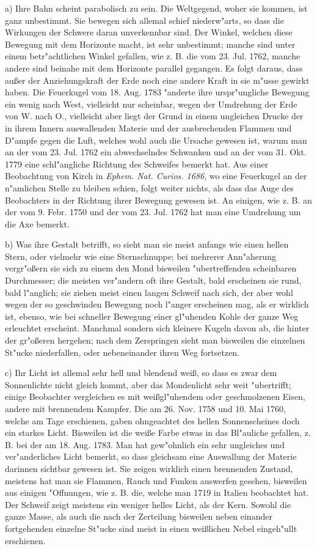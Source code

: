 \documentclass[a4paper, 11pt, oneside, polutonikogreek, german]{article}
\begin{document}
a) Ihre Bahn scheint parabolisch zu sein. Die Weltgegend, woher sie kommen, ist ganz unbestimmt. Sie bewegen sich allemal schief niederw"arts, so dass die Wirkungen der Schwere daran unverkennbar sind. Der Winkel, welchen diese Bewegung mit dem Horizonte macht, ist sehr unbestimmt; manche sind unter einem betr"achtlichen Winkel gefallen, wie z. B. die vom 23. Jul. 1762, manche andere sind beinahe mit dem Horizonte parallel gegangen. Es folgt daraus, dass außer der Anziehungskraft der Erde noch eine andere Kraft in sie m"usse gewirkt haben. Die Feuerkugel vom 18. Aug. 1783 "anderte ihre urspr"ungliche Bewegung ein wenig nach West, vielleicht nur scheinbar, wegen der Umdrehung der Erde von W. nach O., vielleicht aber liegt der Grund in einem ungleichen Drucke der in ihrem Innern auswallenden Materie und der ausbrechenden Flammen und D"ampfe gegen die Luft, welches wohl auch die Ursache gewesen ist, warum man an der vom 23. Jul. 1762 ein abwechselndes Schwanken und an der vom 31. Okt. 1779 eine schl"angliche Richtung des Schweifes bemerkt hat. Aus einer Beobachtung von Kirch in \emph{Ephem. Nat. Curios. 1686}, wo eine Feuerkugel an der n"amlichen Stelle zu bleiben schien, folgt weiter nichts, als dass das Auge des Beobachters in der Richtung ihrer Bewegung gewesen ist. An einigen, wie z. B. an der vom 9. Febr. 1750 und der vom 23. Jul. 1762 hat man eine Umdrehung um die Axe bemerkt.

b) Was ihre Gestalt betrifft, so sieht man sie meist anfangs wie einen hellen Stern, oder vielmehr wie eine Sternschnuppe; bei mehrerer Ann"aherung vergr"oßern sie sich zu einem den Mond bisweilen "ubertreffenden scheinbaren Durchmesser; die meisten ver"andern oft ihre Gestalt, bald erscheinen sie rund, bald l"anglich; sie ziehen meist einen langen Schweif nach sich, der aber wohl wegen der so geschwinden Bewegung noch l"anger erscheinen mag, als er wirklich ist, ebenso, wie bei schneller Bewegung einer gl"uhenden Kohle der ganze Weg erleuchtet erscheint. Manchmal sondern sich kleinere Kugeln davon ab, die hinter der gr"oßeren hergehen; nach dem Zerspringen sieht man bisweilen die einzelnen St"ucke niederfallen, oder nebeneinander ihren Weg fortsetzen.

c) Ihr Licht ist allemal sehr hell und blendend weiß, so dass es zwar dem Sonnenlichte nicht gleich kommt, aber das Mondenlicht sehr weit "ubertrifft; einige Beobachter vergleichen es mit weißgl"uhendem oder geschmolzenen Eisen, andere mit brennendem Kampfer. Die am 26. Nov. 1758 und 10. Mai 1760, welche am Tage erschienen, gaben ohngeachtet des hellen Sonnenscheines doch ein starkes Licht. Bisweilen ist die weiße Farbe etwas in das Bl"auliche gefallen, z. B. bei der am 18. Aug. 1783. Man hat gew"ohnlich ein sehr ungleiches und ver"anderliches Licht bemerkt, so dass gleichsam eine Auswallung der Materie darinnen sichtbar gewesen ist. Sie zeigen wirklich einen brennenden Zustand, meistens hat man sie Flammen, Rauch und Funken auswerfen gesehen, bisweilen aus einigen "Offnungen, wie z. B. die, welche man 1719 in Italien beobachtet hat. Der Schweif zeigt meistens ein weniger helles Licht, als der Kern. Sowohl die ganze Masse, als auch die nach der Zerteilung bisweilen neben einander fortgehenden einzelne St"ucke sind meist in einen weißlichen Nebel eingeh"ullt erschienen.
\end{document}
